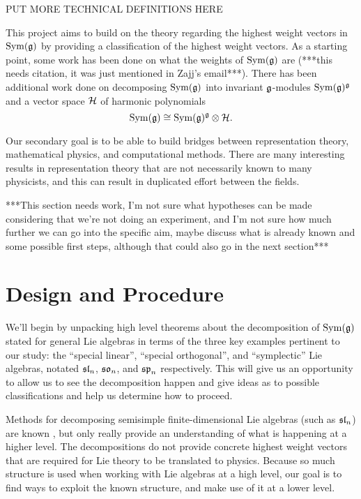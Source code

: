 \documentclass[11pt, reqno]{amsart}
\begin{document}
PUT MORE TECHNICAL DEFINITIONS HERE

This project aims to build on the theory regarding the highest weight vectors in $\operatorname{Sym}(\mathfrak{g})$ by providing a classification of the highest weight vectors.  As a starting point, some work has been done on what the weights of $\operatorname{Sym}(\mathfrak{g})$ are (***this needs citation, it was just mentioned in Zajj's email***). There has been additional work done on decomposing $\operatorname{Sym}(\mathfrak{g})$ into invariant $\mathfrak{g}$-modules $\operatorname{Sym}(\mathfrak{g})^{\mathfrak{g}}$ and a vector space $\mathcal{H}$ of harmonic polynomials \cite[(3.10)]{NeRa2004}
\[\operatorname{Sym}(\mathfrak{g})\cong\operatorname{Sym}(\mathfrak{g})^{\mathfrak{g}}\otimes\mathcal{H}.\] 

Our secondary goal is to be able to build bridges between representation theory, mathematical physics, and computational methods. There are many interesting results in representation theory that are not necessarily known to many physicists, and this can result in duplicated effort between the fields.




***This section needs work, I'm not sure what hypotheses can be made considering that we're not doing an experiment, and I'm not sure how much further we can go into the specific aim, maybe discuss what is already known and some possible first steps, although that could also go in the next section***

\section{Design and Procedure}

We'll begin by unpacking high level theorems about the decomposition of $\operatorname{Sym}(\mathfrak{g})$ stated for general Lie algebras in terms of the three key examples pertinent to our study: the ``special linear'', ``special orthogonal'', and ``symplectic'' Lie algebras, notated $\mathfrak{sl}_n$, $\mathfrak{so}_n$, and $\mathfrak{sp}_n$ respectively. This will give us an opportunity to allow us to see the decomposition happen and give ideas as to possible classifications and help us determine how to proceed.

Methods for decomposing semisimple finite-dimensional Lie algebras (such as $\mathfrak{sl}_n$) are known \cite{Dau14}, but only really provide an understanding of what is happening at a higher level. The decompositions do not provide concrete highest weight vectors that are required for Lie theory to be translated to physics. Because so much structure is used when working with Lie algebras at a high level, our goal is to find ways to exploit the known structure, and make use of it at a lower level.
\end{document}
